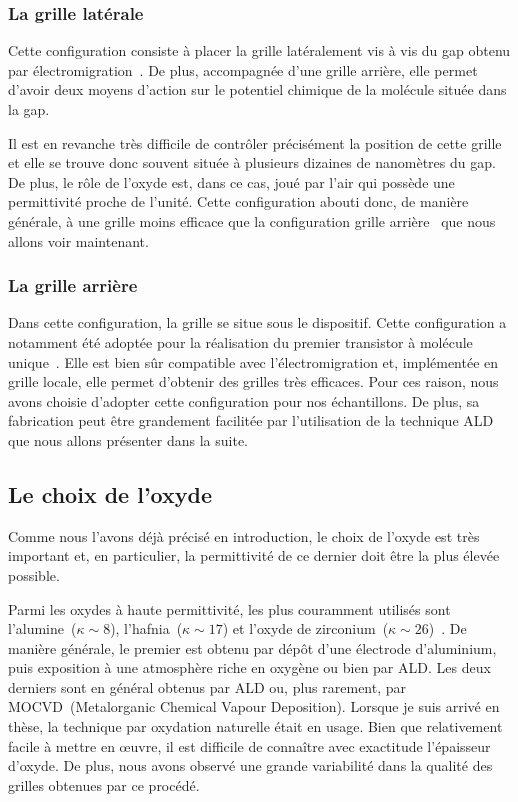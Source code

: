 \subsubsection{La grille latérale}
Cette configuration consiste à placer la grille latéralement vis à vis du gap obtenu par électromigration~\cite{Mangin2009}. De plus, accompagnée d'une grille arrière, elle permet d'avoir deux moyens d'action sur le potentiel chimique de la molécule située dans la gap. 

Il est en revanche très difficile de contr\^oler précisément la position de cette grille et elle se trouve donc souvent située à plusieurs dizaines de nanomètres du gap. De plus, le r\^ole de l'oxyde est, dans ce cas, joué par l'air qui possède une permittivité proche de l'unité. Cette configuration abouti donc, de manière générale, à une grille moins efficace que la configuration grille arrière~\cite{Aurore2009} que nous allons voir maintenant.


\subsubsection{La grille arrière}
Dans cette configuration, la grille se situe sous le dispositif. Cette configuration a notamment été adoptée pour la réalisation du premier transistor à molécule unique~\cite{Park2000}. Elle est bien s\^ur compatible avec l'électromigration et, implémentée en grille locale, elle permet d'obtenir des grilles très efficaces. Pour ces raison, nous avons choisie d’adopter cette configuration pour nos échantillons. De plus, sa fabrication peut \^etre grandement facilitée par l'utilisation de la technique ALD que nous allons présenter dans la suite.


\subsection{Le choix de l'oxyde}
Comme nous l'avons déjà précisé en introduction, le choix de l'oxyde est très important et, en particulier, la permittivité de ce dernier doit être la plus élevée possible.

Parmi les oxydes à haute permittivité, les plus couramment utilisés sont l'alumine~($\kappa \sim 8$), l'hafnia~($\kappa \sim 17$) et l'oxyde de zirconium~($\kappa \sim 26$)~\cite{Biercuk2003}. De manière générale, le premier est obtenu par dépôt d'une électrode d'aluminium, puis exposition à une atmosphère riche en oxygène ou bien par ALD. Les deux derniers sont en général obtenus par ALD ou, plus rarement, par MOCVD~(Metalorganic Chemical Vapour Deposition). Lorsque je suis arrivé en thèse, la technique par oxydation naturelle était en usage. Bien que relativement facile à mettre en œuvre, il est difficile de connaître avec exactitude l'épaisseur d'oxyde. De plus, nous avons observé une grande variabilité dans la qualité des grilles obtenues par ce procédé.

